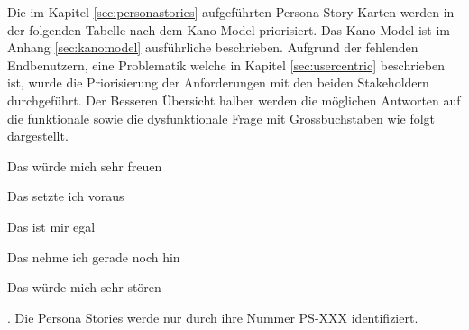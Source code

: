 \begin{description}
Die im Kapitel \ref{sec:personastories} aufgeführten Persona Story Karten werden in der folgenden Tabelle nach dem Kano Model priorisiert. Das Kano Model ist im Anhang \ref{sec:kanomodel} ausführliche beschrieben. Aufgrund der fehlenden Endbenutzern, eine Problematik welche in Kapitel \ref{sec:usercentric} beschrieben ist, wurde die Priorisierung der Anforderungen mit den beiden Stakeholdern durchgeführt. Der Besseren Übersicht halber werden die möglichen Antworten auf die funktionale sowie die dysfunktionale Frage mit Grossbuchstaben wie folgt dargestellt.
\begin{enumerate*}[label={\Alph*)},font={\color{red!50!black}\bfseries}]
	\item Das würde mich sehr freuen
	\item Das setzte ich voraus
	\item Das ist mir egal
	\item Das nehme ich gerade noch hin
	\item Das würde mich sehr stören
\end{enumerate*}. Die Persona Stories werde nur durch ihre Nummer PS-XXX identifiziert.


\end{description}
